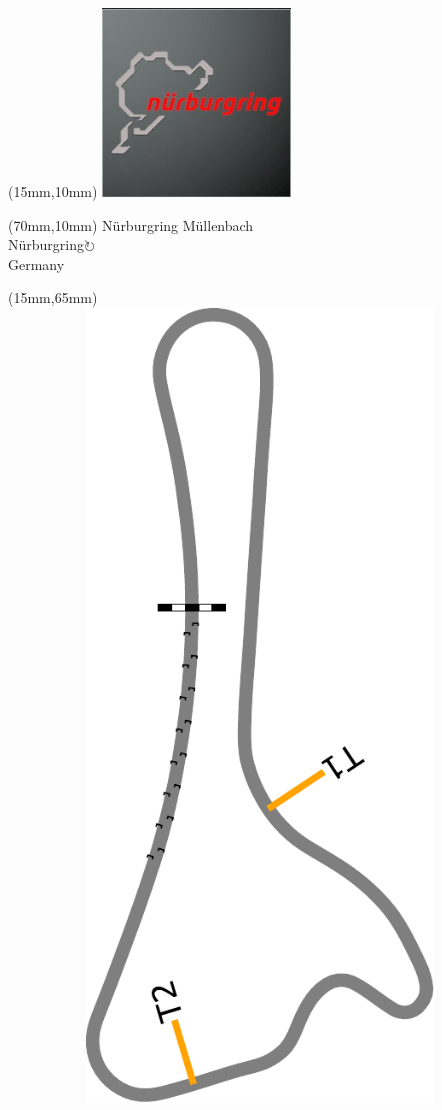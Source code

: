 \null\newpage
\begin{textblock*}{50mm}(15mm,10mm)%
\includegraphics[width=50mm]{LG/2015-05-20_00089.png}
\end{textblock*}
\begin{textblock*}{130mm}(70mm,10mm)%
{\fontsize{20}{20}\selectfont Nürburgring Müllenbach\\}
{\fontsize{16}{16}\selectfont Nürburgring\hfill \Large$\circlearrowright$\\}
{\fontsize{12}{12}\selectfont Germany\\}
\end{textblock*}
\begin{textblock*}{185mm}(15mm,65mm)%
\centering
\mbox{\includegraphics[width=185mm,height=210mm,keepaspectratio]{PT/NBRMB.pdf}}
\end{textblock*}
